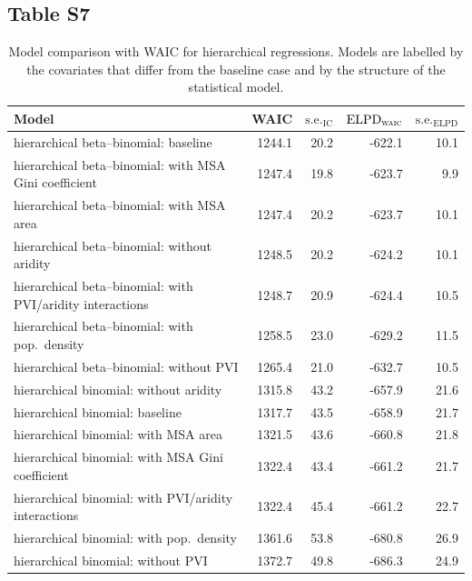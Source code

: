 \documentclass[draft]{agujournal}\usepackage{knitr}
\begin{document}
\subsection*{Table S7}
\begin{table}[H]
\centering
\begingroup\small
\begin{tabular}{p{3in}rrrr}
  \hline
Model & WAIC & $\text{s.e.}_{\text{IC}}$ & $\text{ELPD}_{\text{\scshape{waic}}}$ & $\text{s.e.}_{\text{ELPD}}$ \\ 
  \hline
hierarchical beta--binomial: baseline & 1244.1 & 20.2 & -622.1 & 10.1 \\ 
  hierarchical beta--binomial: with MSA Gini coefficient & 1247.4 & 19.8 & -623.7 & 9.9 \\ 
  hierarchical beta--binomial: with MSA area & 1247.4 & 20.2 & -623.7 & 10.1 \\ 
  hierarchical beta--binomial: without aridity & 1248.5 & 20.2 & -624.2 & 10.1 \\ 
  hierarchical beta--binomial: with PVI/aridity interactions & 1248.7 & 20.9 & -624.4 & 10.5 \\ 
  hierarchical beta--binomial: with pop.\ density & 1258.5 & 23.0 & -629.2 & 11.5 \\ 
  hierarchical beta--binomial: without PVI & 1265.4 & 21.0 & -632.7 & 10.5 \\ 
  hierarchical binomial: without aridity & 1315.8 & 43.2 & -657.9 & 21.6 \\ 
  hierarchical binomial: baseline & 1317.7 & 43.5 & -658.9 & 21.7 \\ 
  hierarchical binomial: with MSA area & 1321.5 & 43.6 & -660.8 & 21.8 \\ 
  hierarchical binomial: with MSA Gini coefficient & 1322.4 & 43.4 & -661.2 & 21.7 \\ 
  hierarchical binomial: with PVI/aridity interactions & 1322.4 & 45.4 & -661.2 & 22.7 \\ 
  hierarchical binomial: with pop.\ density & 1361.6 & 53.8 & -680.8 & 26.9 \\ 
  hierarchical binomial: without PVI & 1372.7 & 49.8 & -686.3 & 24.9 \\ 
   \hline
\end{tabular}
\endgroup
\caption[Model comparison: WAIC (alternate covariates) for hierarchical regressions.]{Model comparison with WAIC for hierarchical regressions. Models are labelled by the covariates that differ from the baseline case and by the structure of the statistical model.} 
\label{tab:waic.vars}
\end{table}
\end{document}
